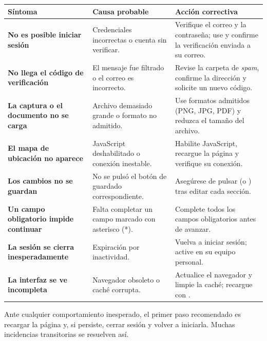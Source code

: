 \vspace{0.2cm}
\noindent
\renewcommand{\arraystretch}{1.4}
\fontsize{9}{11}\selectfont\sffamily
\begin{tabularx}{\textwidth}{|>{\bfseries\color{colorPrimario}}L{3.4cm}|Y|Y|}
\hline
{}
\sffamily\textbf{Síntoma} & \sffamily\textbf{Causa probable} & \sffamily\textbf{Acción correctiva} \\
\hline
No es posible iniciar sesión & Credenciales incorrectas o cuenta sin verificar. &
Verifique el correo y la contraseña; use  y confirme la
verificación enviada a su correo. \\
\hline
{}
No llega el código de verificación & El mensaje fue filtrado o el correo es incorrecto.
& Revise la carpeta de \textit{spam}, confirme la dirección y solicite un nuevo código. \\
\hline
La captura o el documento no se carga & Archivo demasiado grande o formato no admitido.
& Use formatos admitidos (PNG, JPG, PDF) y reduzca el tamaño del archivo. \\
\hline
{}
El mapa de ubicación no aparece & JavaScript deshabilitado o conexión inestable. &
Habilite JavaScript, recargue la página y verifique su conexión. \\
\hline
Los cambios no se guardan & No se pulsó el botón de guardado correspondiente. &
Asegúrese de pulsar  (o ) tras editar cada sección. \\
\hline
{}
Un campo obligatorio impide continuar & Falta completar un campo marcado con asterisco
(*). & Complete todos los campos obligatorios antes de avanzar. \\
\hline
La sesión se cierra inesperadamente & Expiración por inactividad. & Vuelva a iniciar
sesión; active  en su equipo personal. \\
\hline
{}
La interfaz se ve incompleta & Navegador obsoleto o caché corrupta. & Actualice el
navegador y limpie la caché; recargue con . \\
\hline
\end{tabularx}

\vspace{0.3cm}
\begin{AvisoNota}
Ante cualquier comportamiento inesperado, el primer paso recomendado es recargar la
página y, si persiste, cerrar sesión y volver a iniciarla. Muchas incidencias
transitorias se resuelven así.
\end{AvisoNota}

